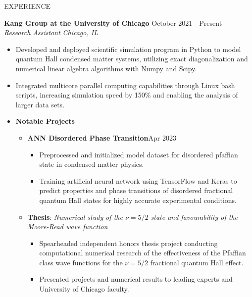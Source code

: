 \documentclass{resume} %
\begin{document}
\vspace{-0.5em}
\begin{rSection}{EXPERIENCE}

\textbf{Kang Group at the University of Chicago} \hfill October 2021 - Present\\
\textit{Research Assistant} \hfill \textit{Chicago, IL}
\vspace{-0.6em}
 \begin{itemize}
   \itemsep -5.8pt {}
   \item Developed and deployed scientific simulation program in Python to model quantum Hall condensed matter systems, utilizing exact diagonalization and numerical linear algebra algorithms with Numpy and Scipy.
   \item Integrated multicore parallel computing capabilities through Linux bash scripts, increasing simulation speed by 150\% and enabling the analysis of larger data sets.
   \item \textbf{Notable Projects}\begin{itemize}
      \item \vspace{-0.6em} \textbf{ANN Disordered Phase Transition}\hfill Apr 2023
      \begin{itemize}
         \vspace{-0.6em}
         \itemsep -5.8pt {}
         \item Preprocessed and initialized model dataset for disordered pfaffian state in condensed matter physics.
         \item Training artificial neural network using TensorFlow and Keras to predict properties and phase transitions of disordered fractional quantum Hall states for highly accurate experimental conditions.
      \end{itemize}
      \item \vspace{-0.6em}\textbf{Thesis}: \textit{Numerical study of the $\nu=5/2$ state and favourability of the Moore-Read wave function}
      \begin{itemize}
         \vspace{-0.6em}
         \itemsep -5.8pt {}
         \item Spearheaded independent honors thesis project conducting computational numerical research of the effectiveness of the Pfaffian class wave functions for the $\nu=5/2$ fractional quantum Hall effect.
         \item Presented projects and numerical results to leading experts and University of Chicago faculty.
          

\end{itemize}
\end{itemize}
\end{itemize}
\end{rSection}
\end{document}
